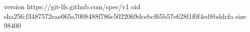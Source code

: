 version https://git-lfs.github.com/spec/v1
oid sha256:f3487572eae065a7008488f786c5022069dcebcf65b57e628f1f0f4ed8bddcfa
size 98400
